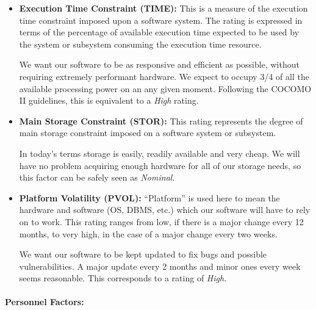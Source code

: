 \documentclass[english]{article}
\begin{document}
\begin{itemize}
\item \textbf{Execution Time Constraint (TIME):} This is a measure of the execution time constraint imposed upon a software system. The rating is expressed in terms of the percentage of available execution time expected to be used by the system or subsystem consuming the execution time resource.

We want our software to be as responsive and efficient as possible, without requiring extremely performant hardware. We expect to occupy 3/4 of all the available processing power on an any given moment. Following the COCOMO II guidelines, this is equivalent to a \textit{High} rating.


\item \textbf{Main Storage Constraint (STOR):} This rating represents the degree of main storage constraint imposed on a software system or subsystem.

In today's terms storage is easily, readily available and very cheap. We will have no problem acquiring enough hardware for all of our storage needs, so this factor can be safely seen as \textit{Nominal}.


\item \textbf{Platform Volatility (PVOL):} “Platform” is used here to mean the  hardware and software (OS, DBMS, etc.) which our software will have to rely on to work. This rating ranges from low, if there is a major change every 12 months, to very high, in the case of a major change every two weeks.

We want our software to be kept updated to fix bugs and possible vulnerabilities. A major update every 2 months and minor ones every week seems reasonable. This corresponds to a rating of \textit{High}.


\end{itemize}

\paragraph{Personnel Factors:}
\end{document}
